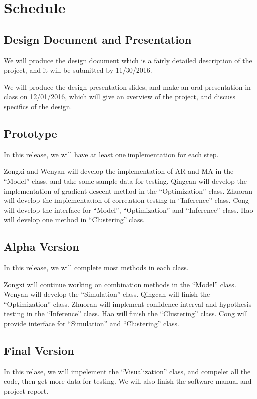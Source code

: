 

\section{Schedule}

\subsection{Design Document and Presentation}

We will produce the design document which is a fairly detailed description of
the project, and it will be submitted by 11/30/2016.

We will produce the design presentation slides, and make an oral presentation in
class on 12/01/2016, which will give an overview of the project, and discuss
specifics of the design.


\subsection{Prototype}

In this release, we will have at least one implementation for each step.

Zongxi and Wenyan will develop the implementation of AR and MA in the ``Model''
class, and take some sample data for testing. Qingcan will develop the
implementation of gradient descent method in the ``Optimization'' class.
Zhuoran will develop the implementation of correlation testing in ``Inference''
class. Cong will develop the interface for ``Model'', ``Optimization'' and
``Inference'' class. Hao will develop one method in ``Clustering'' class.


\subsection{Alpha Version}

In this release, we will complete most methods in each class.

Zongxi will continue working on combination methods in the ``Model'' class.
Wenyan will develop the ``Simulation'' class. Qingcan will finish the
``Optimization'' class. Zhuoran will implement confidence interval and
hypothesis testing in the ``Inference'' class. Hao will finish the
``Clustering'' class. Cong will provide interface for ``Simulation'' and
``Clustering'' class.


\subsection{Final Version}

In this relase, we will impelement the ``Visualization'' class, and compelet all
the code, then get more data for testing. We will also finish the software
manual and project report.
